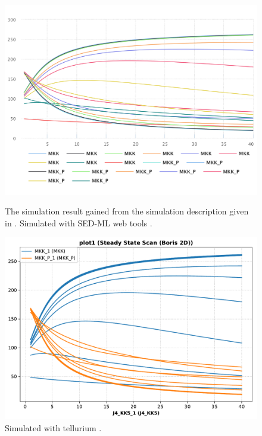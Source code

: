 \begin{figure}[ht]
    \centering
    \begin{minipage}{0.47\textwidth}
        \centering
        \includegraphics[width=1.0\textwidth]{examples/parameter-scan-2d/results/sedml_webtools/plot1}
        \caption{The simulation result gained from the simulation description given in . Simulated with SED-ML web tools \citep{bergmann2017sed}.}
    \end{minipage}\hfill
    \begin{minipage}{0.47\textwidth}
        \centering
        \includegraphics[width=1.0\textwidth]{examples/parameter-scan-2d/results/tellurium/plot1}
        \caption{Simulated with tellurium \citep{tellurium}.}
    \end{minipage}
    \label{fig:parameter-scan-2d}
\end{figure}

